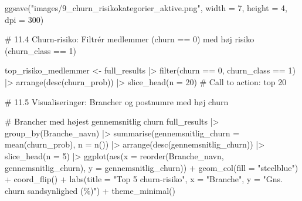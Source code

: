\documentclass[
  11pt,
  letterpaper,
  DIV=11,
  numbers=noendperiod]{scrartcl}
\newenvironment{Shaded}{\begin{snugshade}}{\end{snugshade}}
\newcommand{\AttributeTok}[1]{\textcolor[rgb]{0.40,0.45,0.13}{#1}}
\newcommand{\CommentTok}[1]{\textcolor[rgb]{0.37,0.37,0.37}{#1}}
\newcommand{\DecValTok}[1]{\textcolor[rgb]{0.68,0.00,0.00}{#1}}
\newcommand{\FunctionTok}[1]{\textcolor[rgb]{0.28,0.35,0.67}{#1}}
\newcommand{\NormalTok}[1]{\textcolor[rgb]{0.00,0.23,0.31}{#1}}
\newcommand{\OtherTok}[1]{\textcolor[rgb]{0.00,0.23,0.31}{#1}}
\newcommand{\SpecialCharTok}[1]{\textcolor[rgb]{0.37,0.37,0.37}{#1}}
\newcommand{\StringTok}[1]{\textcolor[rgb]{0.13,0.47,0.30}{#1}}
\begin{document}
\begin{Shaded}
\begin{Highlighting}[]
\FunctionTok{ggsave}\NormalTok{(}\StringTok{"images/9\_churn\_risikokategorier\_aktive.png"}\NormalTok{, }\AttributeTok{width =} \DecValTok{7}\NormalTok{, }\AttributeTok{height =} \DecValTok{4}\NormalTok{, }\AttributeTok{dpi =} \DecValTok{300}\NormalTok{)}

\CommentTok{\# 11.4 Churn{-}risiko: Filtrér medlemmer (churn == 0) med høj risiko (churn\_class == 1)}


\NormalTok{top\_risiko\_medlemmer }\OtherTok{\textless{}{-}}\NormalTok{ full\_results }\SpecialCharTok{|\textgreater{}} 
  \FunctionTok{filter}\NormalTok{(churn }\SpecialCharTok{==} \DecValTok{0}\NormalTok{, churn\_class }\SpecialCharTok{==} \DecValTok{1}\NormalTok{) }\SpecialCharTok{|\textgreater{}} 
  \FunctionTok{arrange}\NormalTok{(}\FunctionTok{desc}\NormalTok{(churn\_prob)) }\SpecialCharTok{|\textgreater{}} 
  \FunctionTok{slice\_head}\NormalTok{(}\AttributeTok{n =} \DecValTok{20}\NormalTok{)  }\CommentTok{\# Call to action: top 20}


\CommentTok{\# 11.5 Visualiseringer: Brancher og postnumre med høj churn}


\CommentTok{\# Brancher med højest gennemsnitlig churn}
\NormalTok{full\_results }\SpecialCharTok{|\textgreater{}} 
  \FunctionTok{group\_by}\NormalTok{(Branche\_navn) }\SpecialCharTok{|\textgreater{}} 
  \FunctionTok{summarise}\NormalTok{(}\AttributeTok{gennemsnitlig\_churn =} \FunctionTok{mean}\NormalTok{(churn\_prob), }\AttributeTok{n =} \FunctionTok{n}\NormalTok{()) }\SpecialCharTok{|\textgreater{}} 
  \FunctionTok{arrange}\NormalTok{(}\FunctionTok{desc}\NormalTok{(gennemsnitlig\_churn)) }\SpecialCharTok{|\textgreater{}} 
  \FunctionTok{slice\_head}\NormalTok{(}\AttributeTok{n =} \DecValTok{5}\NormalTok{) }\SpecialCharTok{|\textgreater{}} 
  \FunctionTok{ggplot}\NormalTok{(}\FunctionTok{aes}\NormalTok{(}\AttributeTok{x =} \FunctionTok{reorder}\NormalTok{(Branche\_navn, gennemsnitlig\_churn), }\AttributeTok{y =}\NormalTok{ gennemsnitlig\_churn)) }\SpecialCharTok{+}
  \FunctionTok{geom\_col}\NormalTok{(}\AttributeTok{fill =} \StringTok{"steelblue"}\NormalTok{) }\SpecialCharTok{+}
  \FunctionTok{coord\_flip}\NormalTok{() }\SpecialCharTok{+}
  \FunctionTok{labs}\NormalTok{(}\AttributeTok{title =} \StringTok{"Top 5 churn{-}risiko"}\NormalTok{, }\AttributeTok{x =} \StringTok{"Branche"}\NormalTok{, }\AttributeTok{y =} \StringTok{"Gns. churn sandsynlighed (\%)"}\NormalTok{) }\SpecialCharTok{+}
  \FunctionTok{theme\_minimal}\NormalTok{()}
\end{Highlighting}
\end{Shaded}
\end{document}
